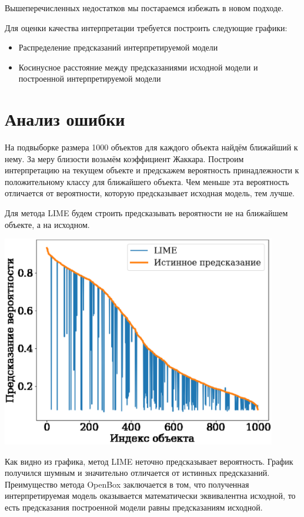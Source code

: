 \documentclass[a4paper, 12pt]{article}
\begin{document}
Вышеперечисленных недостатков мы постараемся избежать в новом подходе.

Для оценки качества интерпретации требуется построить следующие графики:
\begin{itemize}
\item Распределение предсказаний интерпретируемой модели

\item Косинусное расстояние между предсказаниями исходной модели и построенной интерпретируемой модели
\end{itemize}

\section{Анализ ошибки}
На подвыборке размера 1000 объектов для каждого объекта найдём ближайший к нему. За меру близости возьмём коэффициент Жаккара. Построим интерпретацию на текущем объекте и предскажем вероятность принадлежности к положительному классу для ближайшего объекта. Чем меньше эта вероятность отличается от вероятности, которую предсказывает исходная модель, тем лучше. 

Для метода LIME будем строить предсказывать вероятности не на ближайшем объекте, а на исходном.

\includegraphics[width=0.9\textwidth]{../figures/lime_proba_est.eps}

Как видно из графика, метод LIME неточно предсказывает вероятность. График получился шумным и значительно отличается от истинных предсказаний. Преимущество метода OpenBox заключается в том, что полученная интерпретируемая модель оказывается математически эквивалентна исходной, то есть предсказания построенной модели равны предсказаниям исходной.
\end{document}
